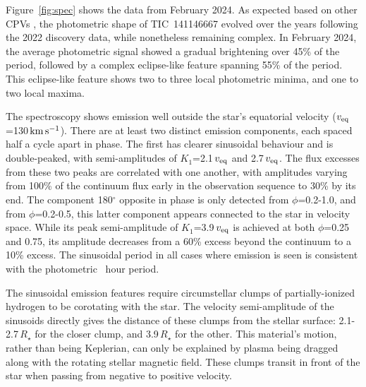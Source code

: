 \documentclass{nature3}
\newcommand{\kms}{\ensuremath{\rm km\,s^{-1}}}
\begin{document}
Figure~\ref{fig:spec} shows the data from February 2024.  As expected
based on other CPVs \cite{Bouma2024}, the photometric shape of
TIC~141146667 evolved over the years following the 2022 discovery
data, while nonetheless remaining complex.  In February 2024, the
average photometric signal showed a gradual brightening over 45\% of
the period, followed by a complex eclipse-like feature spanning 55\%
of the period.  This eclipse-like feature shows two to three
local photometric minima, and one to two local maxima.

The spectroscopy shows emission well outside the star's
equatorial velocity ($v_{\rm eq}$=130\,\kms).  There are at least two
distinct emission components, each spaced half a cycle apart in phase.  The
first has clearer sinusoidal behaviour and is double-peaked, with
semi-amplitudes of $K_1$=2.1\,$v_{\rm eq}$ and 2.7\,$v_{\rm eq}$.  The
flux excesses from these two peaks are correlated with one another,
with amplitudes varying from 100\% of the continuum flux early in the
observation sequence to 30\% by its end.  The component 180$^\circ$
opposite in phase is only detected from $\phi$=0.2-1.0, and 
from $\phi$=0.2-0.5, this latter component appears connected to the
star in velocity space.  While its peak semi-amplitude of
$K_1$=3.9\,$v_{\rm eq}$ is achieved at both $\phi$=0.25 and 0.75, its
amplitude decreases from a 60\% excess beyond the continuum to a 10\%
excess.   The sinusoidal period in all cases where emission is seen is
consistent with the photometric \periodhr\ hour period.  

The sinusoidal emission features require circumstellar clumps of
partially-ionized hydrogen to be corotating with the star.  The
velocity semi-amplitude of the sinusoids directly gives the distance
of these clumps from the stellar surface: 2.1-2.7\,$R_\star$ for the
closer clump, and 3.9\,$R_\star$ for the other.  This material's
motion, rather than being Keplerian, can only be explained by plasma
being dragged along with the rotating stellar magnetic field.  These
clumps transit in front of the star when passing from negative to
positive velocity.
\end{document}
